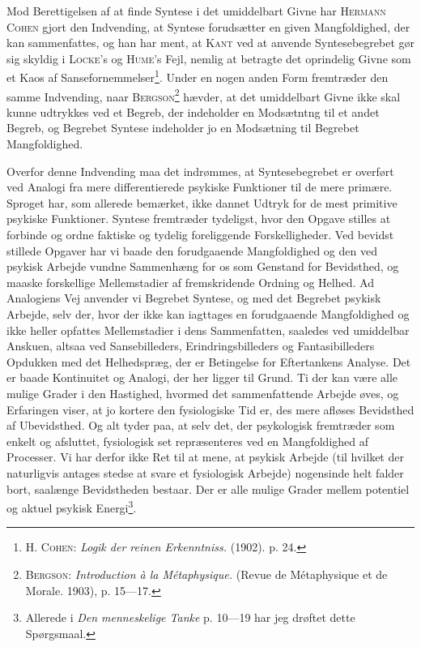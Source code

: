 \documentclass[12pt]{article}
\newcommand{\opage}[1]{\marginnote{\footnotesize\textit{[#1]}}}
\begin{document}
Mod Berettigelsen af at finde Syntese i det umiddelbart Givne har \textsc{Hermann
Cohen} gjort den Indvending, at Syntese forudsætter en given Mangfoldighed, der
kan sammenfattes, og han har ment, at \textsc{Kant} ved at anvende Syntesebegrebet gør
sig skyldig i \textsc{Locke}'s og \textsc{Hume}'s Fejl, nemlig at betragte det oprindelig
Givne som et Kaos af Sansefornemmelser\footnote{\textsc{H. Cohen}: \textit{Logik der
reinen Erkenntniss.} (1902). p. 24.}.
Under en nogen anden Form fremtræder den
samme Indvending, naar \textsc{Bergson}\footnote{\textsc{Bergson}: \textit{Introduction
à la Métaphysique.} (Revue de Métaphysique et de Morale. 1903), p. 15---17.} hævder,
at det umiddelbart Givne ikke skal
kunne udtrykkes ved et Begreb, der indeholder en Modsætntng til et andet Begreb,
og Begrebet Syntese indeholder jo en Modsætning til Begrebet Mangfoldighed.

Overfor denne Indvending maa det indrømmes, at Syntesebegrebet er overført
ved Analogi fra mere differentierede psykiske Funktioner til de mere primære.
Sproget har, som allerede bemærket, ikke dannet Udtryk for de mest primitive
psykiske Funktioner. Syntese fremtræder tydeligst, hvor den Opgave stilles at
forbinde og ordne faktiske og tydelig foreliggende Forskelligheder. Ved bevidst
stillede Opgaver har vi baade den forudgaaende Mangfoldighed og den ved psykisk
Arbejde vundne Sammenhæng for os som Genstand for Bevidsthed, og maaske
forskellige Mellemstadier af fremskridende Ordning og Helhed. Ad Analogiens Vej
anvender vi Begrebet Syntese, og med det Begrebet psykisk Arbejde, selv der, hvor
der ikke kan iagttages en forudgaaende Mangfoldighed og ikke heller opfattes
Mellemstadier i dens Sammenfatten, saaledes ved umiddelbar Anskuen, altsaa ved
Sansebilleders, Erindringsbilleders og Fantasibilleders Opdukken med det
Helhedspræg, der er Betingelse for Eftertankens Analyse. Det er baade Kontinuitet og
Analogi, der her ligger til Grund. Ti der kan være alle mulige Grader i den
Hastighed, hvormed det sammenfattende Arbejde øves, og Erfaringen viser, at jo
kortere den fysiologiske Tid er, des mere afløses Bevidsthed af Ubevidsthed. Og
\setcounter{footnote}{0}%
\opage{29}alt tyder paa, at selv det, der psykologisk fremtræder som enkelt og afsluttet,
fysiologisk set repræsenteres ved en Mangfoldighed af Processer. Vi har derfor ikke
Ret til at mene, at psykisk Arbejde (til hvilket der naturligvis antages stedse at
svare et fysiologisk Arbejde) nogensinde helt falder bort, saalænge Bevidstheden
bestaar. Der er alle mulige Grader mellem potentiel og aktuel psykisk
Energi\footnote{Allerede i \textit{Den menneskelige Tanke} p. 10---19 har jeg drøftet
dette Spørgsmaal.}.
\end{document}
